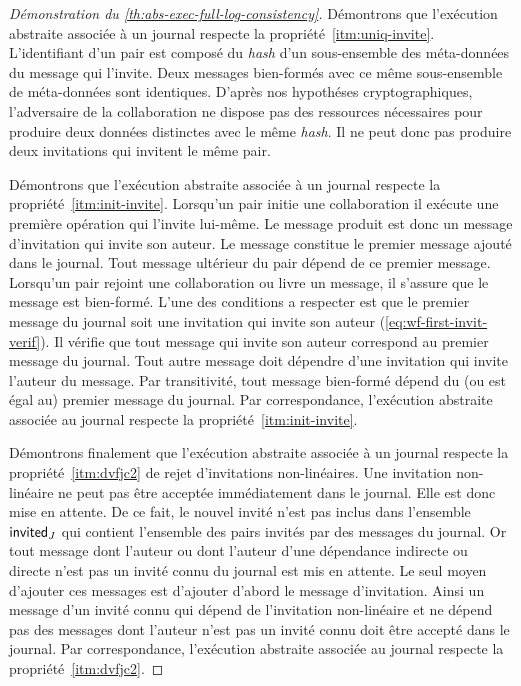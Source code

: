 \begin{proof}[Démonstration du \autoref{th:abs-exec-full-log-consistency}]
\medskip

Démontrons que l'exécution abstraite associée à un journal  respecte la propriété~\ref{itm:uniq-invite}.
L'identifiant d'un pair est composé du \emph{hash} d'un sous-ensemble des méta-données du message qui l'invite.
Deux messages bien-formés avec ce même sous-ensemble de méta-données sont identiques.
D'après nos hypothéses cryptographiques, l'adversaire de la collaboration ne dispose pas des ressources nécessaires pour produire deux données distinctes avec le même \emph{hash}.
Il ne peut donc pas produire deux invitations qui invitent le même pair.

\medskip

Démontrons que l'exécution abstraite associée à un journal respecte la propriété~\ref{itm:init-invite}.
Lorsqu'un pair initie une collaboration il exécute une première opération qui l'invite lui-même.
Le message produit est donc un message d'invitation qui invite son auteur.
Le message constitue le premier message ajouté dans le journal.
Tout message ultérieur du pair dépend de ce premier message.
Lorsqu'un pair rejoint une collaboration ou livre un message, il s'assure que le message est bien-formé.
L'une des conditions a respecter est que le premier message du journal soit une invitation qui invite son auteur (\autoref{eq:wf-first-invit-verif}).
Il vérifie que tout message qui invite son auteur correspond au premier message du journal.
Tout autre message doit dépendre d'une invitation qui invite l'auteur du message.
Par transitivité, tout message bien-formé dépend du (ou est égal au) premier message du journal.
Par correspondance, l'exécution abstraite associée au journal respecte la propriété~\ref{itm:init-invite}.

\medskip

Démontrons finalement que l'exécution abstraite associée à un journal respecte la propriété~\ref{itm:dvfjc2} de rejet d'invitations non-linéaires.
Une invitation non-linéaire ne peut pas être acceptée immédiatement dans le journal.
Elle est donc mise en attente.
De ce fait, le nouvel invité n'est pas inclus dans l'ensemble $\operatorname{\mathsf{invited}}_J$ qui contient l'ensemble des pairs invités par des messages du journal.
Or tout message dont l'auteur ou dont l'auteur d'une dépendance indirecte ou directe n'est pas un invité connu du journal est mis en attente.
Le seul moyen d'ajouter ces messages est d'ajouter d'abord le message d'invitation.
Ainsi un message d'un invité connu qui dépend de l'invitation non-linéaire et ne dépend pas des messages dont l'auteur n'est pas un invité connu doit être accepté dans le journal.
Par correspondance, l'exécution abstraite associée au journal respecte la propriété~\ref{itm:dvfjc2}.
\end{proof}


